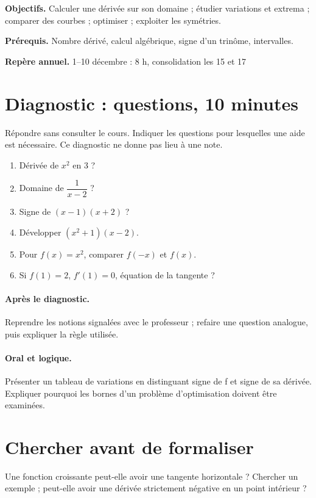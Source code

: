 \label{C06}
\begin{keypoint}
\textbf{Objectifs.} Calculer une dérivée sur son domaine ; étudier variations et extrema ; comparer des courbes ; optimiser ; exploiter les symétries.

\textbf{Prérequis.} Nombre dérivé, calcul algébrique, signe d’un trinôme, intervalles.

\textbf{Repère annuel.} 1–10 décembre : 8 h, consolidation les 15 et 17\end{keypoint}
\section*{Diagnostic :  questions, 10 minutes}\label{C06-D}
Répondre sans consulter le cours. Indiquer les questions pour lesquelles une aide est nécessaire. Ce diagnostic ne donne pas lieu à une note.
\begin{enumerate}
\item Dérivée de $x^2$ en 3 ?
\item Domaine de $\dfrac{1}{x-2}$ ?
\item Signe de $(x-1)(x+2)$ ?
\item Développer $(x^2+1)(x-2)$.
\item Pour $f(x)=x^2$, comparer $f(-x)$ et $f(x)$.
\item Si $f(1)=2$, $f\prime(1)=0$, équation de la tangente ?
\end{enumerate}
\paragraph{Après le diagnostic.} Reprendre les notions signalées avec le professeur ; refaire une question analogue, puis expliquer la règle utilisée.
\paragraph{Oral et logique.} Présenter un tableau de variations en distinguant signe de f et signe de sa dérivée. Expliquer pourquoi les bornes d’un problème d’optimisation doivent être examinées.
\mxnewpage
\section*{Chercher avant de formaliser}\label{C06-RECH}
Une fonction croissante peut-elle avoir une tangente horizontale ? Chercher un exemple ; peut-elle avoir une dérivée strictement négative en un point intérieur ?
